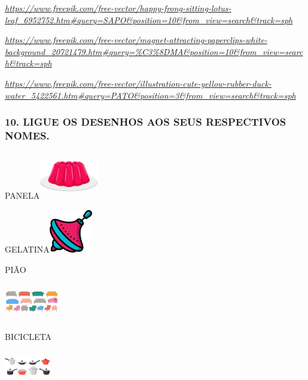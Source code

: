 \href{https://www.freepik.com/free-vector/happy-frong-sitting-lotus-leaf_6952752.htm\#query=SAPO\&position=10\&from_view=search\&track=sph}{\emph{https://www.freepik.com/free-vector/happy-frong-sitting-lotus-leaf\_6952752.htm\#query=SAPO\&position=10\&from\_view=search\&track=sph}}

\href{https://www.freepik.com/free-vector/magnet-attracting-paperclips-white-background_20721479.htm\#query=\%C3\%8DMA\&position=10\&from_view=search\&track=sph}{\emph{https://www.freepik.com/free-vector/magnet-attracting-paperclips-white-background\_20721479.htm\#query=\%C3\%8DMA\&position=10\&from\_view=search\&track=sph}}

\href{https://www.freepik.com/free-vector/illustration-cute-yellow-rubber-duck-water_5422561.htm\#query=PATO\&position=3\&from_view=search\&track=sph}{\emph{https://www.freepik.com/free-vector/illustration-cute-yellow-rubber-duck-water\_5422561.htm\#query=PATO\&position=3\&from\_view=search\&track=sph}}

\subsubsection{10. LIGUE OS DESENHOS AOS SEUS RESPECTIVOS NOMES.}\label{ligue-so-desenho-para-o-seu-nomes.}

PANELA\includegraphics[width=1.02083in,height=0.81667in]{media/image43.png}

GELATINA\includegraphics[width=0.75000in,height=0.73958in]{media/image44.png}

PIÃO

\includegraphics[width=0.93750in,height=0.62014in]{media/image45.jpg}

BICICLETA

\includegraphics[width=0.79167in,height=0.55208in]{media/image46.png}

